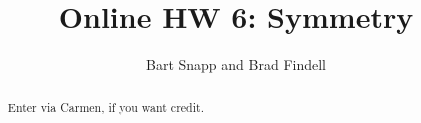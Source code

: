 \documentclass[space,nooutcomes]{xourse}
\title{Online HW 6: Symmetry}
\author{Bart Snapp and Brad Findell}
\begin{document}
\begin{abstract}
Enter via Carmen, if you want credit.  
\end{abstract}
\maketitle

{}
\end{document}
